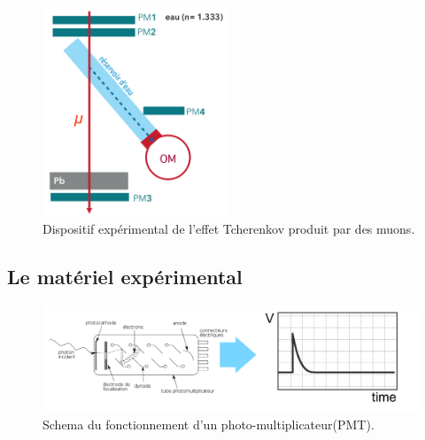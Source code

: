\begin{figure}[!h]
    \centering
	\includegraphics[width=0.5\textwidth]{figures/Dispositif_2.png}
    \caption{Dispositif expérimental de l'effet Tcherenkov produit par des muons.}
    \label{fig:dispo2} 
\end{figure}


\subsection{Le matériel expérimental}

\begin{figure}
    \centering
	\includegraphics[width=\textwidth]{figures/PMT_readout.png}
    \caption{Schema du fonctionnement d'un photo-multiplicateur(PMT).}
    \label{fig:PMT_readout} 
\end{figure}

